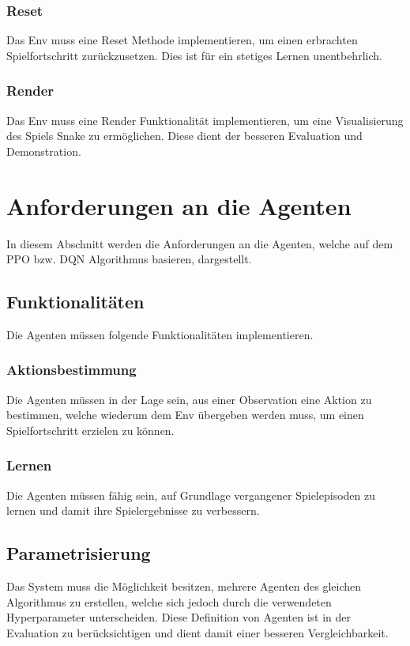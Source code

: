 \subsubsection{Reset} \label{sec:Anforderung_Reset}
Das Env muss eine Reset Methode implementieren, um einen erbrachten Spielfortschritt zurückzusetzen. Dies ist für ein stetiges Lernen unentbehrlich.

\subsubsection{Render} \label{sec:visualisierung_Env}
Das Env muss eine Render Funktionalität implementieren, um eine Visualisierung des Spiels Snake zu ermöglichen. Diese dient der besseren Evaluation und Demonstration.

\section{Anforderungen an die Agenten} \label{sec:Anforderungen_Agenten}
In diesem Abschnitt werden die Anforderungen an die Agenten, welche auf dem PPO bzw. DQN Algorithmus basieren, dargestellt.

\subsection{Funktionalitäten} \label{sec:Agent_Funktionalitäten}
Die Agenten müssen folgende Funktionalitäten implementieren.

\subsubsection{Aktionsbestimmung} \label{sec:Anforderungen_Aktionsbestimmung}
Die Agenten müssen in der Lage sein, aus einer Observation eine Aktion zu bestimmen, welche wiederum dem Env übergeben werden muss, um einen Spielfortschritt erzielen zu können.

\subsubsection{Lernen} \label{sec:Anforderungen_Lernen}
Die Agenten müssen fähig sein, auf Grundlage vergangener Spielepisoden zu lernen und damit ihre Spielergebnisse zu verbessern.

\subsection{Parametrisierung} \label{sec:Anforderungen_Parametrisierung}
Das System muss die Möglichkeit besitzen, mehrere Agenten des gleichen Algorithmus zu erstellen, welche sich jedoch durch die verwendeten Hyperparameter unterscheiden. Diese Definition von Agenten ist in der Evaluation zu berücksichtigen und dient damit einer besseren Vergleichbarkeit.


